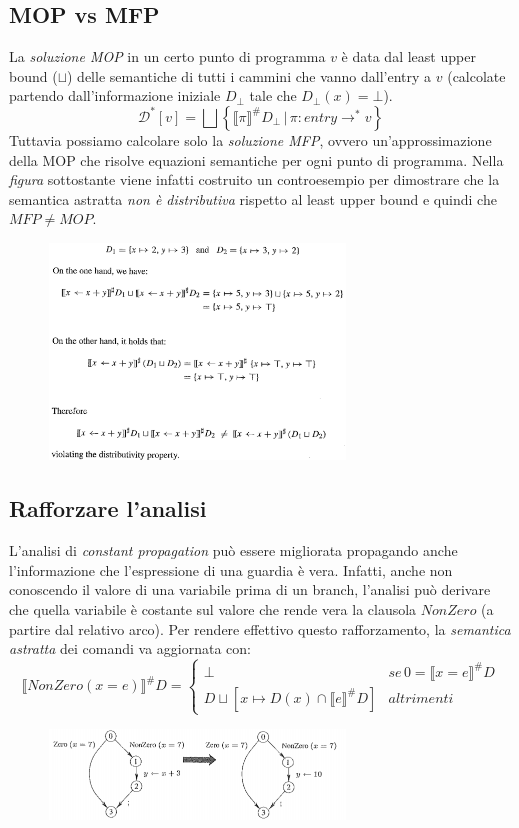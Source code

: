 \documentclass[a4paper,oneside,titlepage]{book}
\begin{document}
\subsection{MOP vs MFP}
La \textit{soluzione MOP} in un certo punto di programma $v$ è data dal least upper bound ($\sqcup$) delle semantiche di tutti i cammini che vanno dall'entry a $v$ (calcolate partendo dall'informazione iniziale $D_\bot$ tale che $D_\bot(x) = \bot$).
\[ \mathcal{D}^* [v] = \bigsqcup \left\{ \llbracket \pi \rrbracket^\# D_\bot \, | \, \pi: entry \rightarrow^* v \right\} \]
Tuttavia possiamo calcolare solo la \textit{soluzione MFP}, ovvero un'approssimazione della MOP che risolve equazioni semantiche per ogni punto di programma. Nella \textit{figura} sottostante viene infatti costruito un controesempio per dimostrare che la semantica astratta \textit{non è distributiva} rispetto al least upper bound e quindi che $MFP \neq MOP$.
\begin{figure}[htp]
	\centering
	\includegraphics[width=0.7\textwidth]{const9.png}
\end{figure}

\subsection{Rafforzare l'analisi}
L'analisi di \textit{constant propagation} può essere migliorata propagando anche l'informazione che l'espressione di una guardia è vera. Infatti, anche non conoscendo il valore di una variabile prima di un branch, l'analisi può derivare che quella variabile è costante sul valore che rende vera la clausola $NonZero$ (a partire dal relativo arco). Per rendere effettivo questo rafforzamento, la \textit{semantica astratta} dei comandi va aggiornata con:
\[
\llbracket NonZero(x = e) \rrbracket^\# D =
	\begin{cases}
		\bot & se \, 0 = \llbracket x = e \rrbracket^\# D \\
		D \sqcup \left[ x \mapsto D(x) \cap \llbracket e \rrbracket^\# D \right] & altrimenti
	\end{cases}
\]
\begin{figure}[htp]
	\centering
	\includegraphics[width=0.7\textwidth]{const10.png}
\end{figure}
\end{document}
